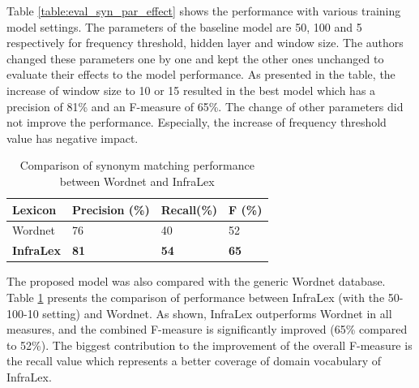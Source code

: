 \documentclass[Journal,InsideFigs, DoubleSpace]{ascelike} %
\begin{document}
%
Table \ref{table:eval_syn_par_effect} shows the performance with various training model settings. The parameters of the baseline model are 50, 100 and 5 respectively for frequency threshold, hidden layer and window size. The authors changed these parameters one by one and kept the other ones unchanged to evaluate their effects to the model performance. As presented in the table, the increase of window size to 10 or 15 resulted in the best model which has a precision of 81\% and an F-measure of 65\%. The change of other parameters did not improve the performance. Especially, the increase of frequency threshold value has negative impact. 
%
\begin{table} [b] 
	\caption{Comparison of synonym matching performance between Wordnet and InfraLex}
	\label{table:eval_syn_vs_Wordnet}
	\centering
	\small
	\renewcommand{\arraystretch}{1.25}
	\begin{tabular}{l l l l }
		\hline
		\hline
		\textbf{Lexicon} & \textbf{Precision (\%)}  & \textbf{Recall(\%)} & \textbf{F (\%)}\\
		\hline
		Wordnet	&76 	&40 	&52\\	
		\textbf{InfraLex} &\textbf{81}	&\textbf{54}		&\textbf{65}\\	
		\hline
		\hline
	\end{tabular}
	\normalsize
\end{table}
\par
The proposed model was also compared with the generic Wordnet database. Table \ref{table:eval_syn_vs_Wordnet} presents the comparison of performance between InfraLex (with the 50-100-10 setting) and Wordnet. As shown, InfraLex outperforms Wordnet in all measures, and the combined F-measure is significantly improved (65\% compared to 52\%). The biggest contribution to the improvement of the overall F-measure is the recall value which represents a better coverage of domain vocabulary of InfraLex. 
\end{document}
